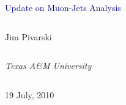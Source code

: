 \documentclass[compress]{beamer}
\begin{document}
\begin{frame}
\vfill
\begin{center}
\textcolor{darkblue}{\Large Update on Muon-Jets Analysis}

\vfill
\begin{columns}
\begin{center}
\large
Jim Pivarski
\end{center}
\end{columns}

\begin{columns}
\begin{center}
\scriptsize
{\it Texas A\&M University}
\end{center}
\end{columns}

\vfill
19 July, 2010

\end{center}
\end{frame}


\small
\end{document}
